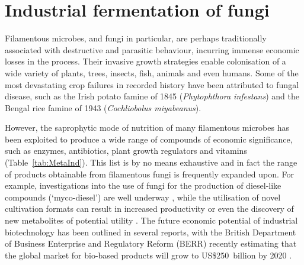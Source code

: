 \section{Industrial fermentation of fungi}

Filamentous microbes, and fungi in particular, are perhaps traditionally associated with destructive and parasitic behaviour, incurring immense economic losses in the process. Their invasive growth strategies enable colonisation of a wide variety of plants, trees, insects, fish, animals and even humans. Some of the most devastating crop failures in recorded history have been attributed to fungal disease, such as the Irish potato famine of 1845 (\emph{Phytophthora infestans}) and the Bengal rice famine of 1943 (\emph{Cochliobolus miyabeanus}).

However, the saprophytic mode of nutrition of many filamentous microbes has been exploited to produce a wide range of compounds of economic significance, such as enzymes, antibiotics, plant growth regulators and vitamins (Table~\ref{tab:MetaInd}). This list is by no means exhaustive and in fact the range of products obtainable from filamentous fungi is frequently expanded upon. For example, investigations into the use of fungi for the production of diesel-like compounds (\lq myco-diesel') are well underway \cite{adamczak2009}, while the utilisation of novel cultivation formats can result in increased productivity \cite{papagianni2004} or even the discovery of new metabolites of potential utility \cite{bigelis2006}. The future economic potential of industrial biotechnology has been outlined in several reports, with the British Department of Business Enterprise and Regulatory Reform (BERR) recently estimating that the global market for bio-based products will grow to US\$250~billion by 2020 \cite{berr2009}.

